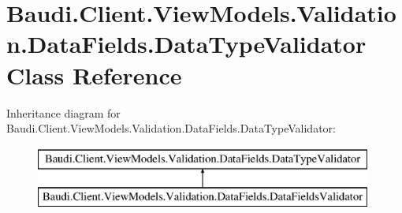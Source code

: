 \hypertarget{class_baudi_1_1_client_1_1_view_models_1_1_validation_1_1_data_fields_1_1_data_type_validator}{}\section{Baudi.\+Client.\+View\+Models.\+Validation.\+Data\+Fields.\+Data\+Type\+Validator Class Reference}
\label{class_baudi_1_1_client_1_1_view_models_1_1_validation_1_1_data_fields_1_1_data_type_validator}
Inheritance diagram for Baudi.\+Client.\+View\+Models.\+Validation.\+Data\+Fields.\+Data\+Type\+Validator\+:\begin{figure}[H]
\begin{center}
\leavevmode
\includegraphics[height=2.000000cm]{class_baudi_1_1_client_1_1_view_models_1_1_validation_1_1_data_fields_1_1_data_type_validator}
\end{center}
\end{figure}
